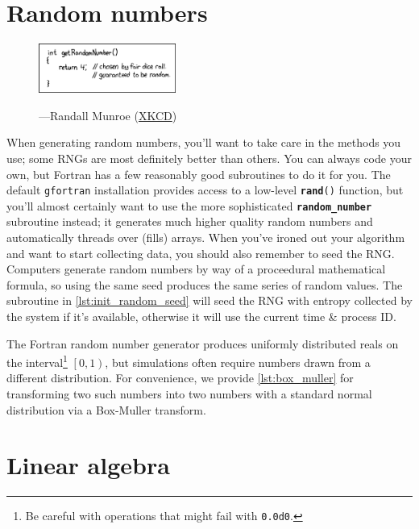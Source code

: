 \documentclass[openany,oneside]{report}
\newcommand{\keyword}[1]{\texttt{\bfseries\color{DarkRed}#1}}
\begin{document}
\chapter{Random numbers}
\label{chap:Random numbers}
\begin{figure}[h!]
  \centering
  \includegraphics[width=0.4\textwidth]{figures/random_number.png}

  \hspace*{\fill}---Randall Munroe (\href{http://xkcd.com/221/}{XKCD})
\end{figure}
When generating random numbers, you'll want to take care in the methods you use; some RNGs are most definitely better than others.
You can always code your own, but Fortran has a few reasonably good subroutines to do it for you.
The default \texttt{gfortran} installation provides access to a low-level \texttt{\keyword{rand}()} function, but you'll almost certainly want to use the more sophisticated \keyword{random\_number} subroutine instead; it generates much higher quality random numbers and automatically threads over (fills) arrays.
When you've ironed out your algorithm and want to start collecting data, you should also remember to seed the RNG.
Computers generate random numbers by way of a proceedural mathematical formula, so using the same seed produces the same series of random values.
The subroutine in \autoref{lst:init_random_seed} will seed the RNG with entropy collected by the system if it's available, otherwise it will use the current time \& process ID.


The Fortran random number generator produces uniformly distributed reals on the interval\footnote{Be careful with operations that might fail with \texttt{0.0d0}.} $\left[0, 1\right)$, but simulations often require numbers drawn from a different distribution. 
For convenience, we provide \autoref{lst:box_muller} for transforming two such numbers into two numbers with a standard normal distribution via a Box-Muller transform.


\chapter{Linear algebra}
\label{chap:Linear algebra}
\end{document}
